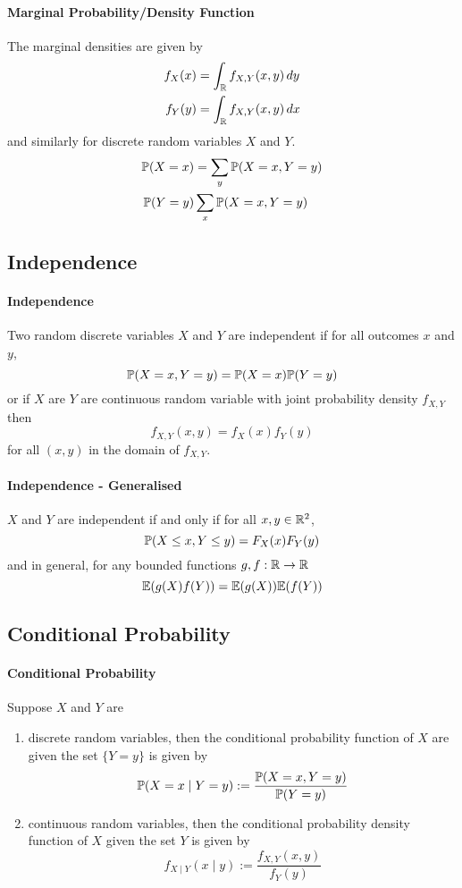 \paragraph{Marginal Probability/Density Function}
The marginal densities are given by
\begin{align*}
    f_X(x) & = \int_{\mathbb{R}} f_{X,Y}(x,y) \, dy \\
    f_Y(y) & = \int_{\mathbb{R}} f_{X,Y}(x,y) \, dx
\end{align*}
and similarly for discrete random variables \(X\) and \(Y\).
\begin{align*}
    \mathbb{P}(X = x) & = \sum_y \mathbb{P}(X = x, Y = y) \\
    \mathbb{P}(Y = y) & \sum_x \mathbb{P}(X = x, Y = y)
\end{align*}

\subsection{Independence}
\paragraph{Independence}
Two random discrete variables \(X\) and \(Y\) are independent if for all outcomes \(x\) and \(y\),
\[\mathbb{P}(X = x, Y = y) = \mathbb{P}(X = x)\mathbb{P}(Y = y)\]
or if \(X\) are \(Y\) are continuous random variable with joint probability density \(f_{X,Y}\) then
\[f_{X,Y} (x,y) = f_X(x) f_Y(y)\]
for all \((x,y)\) in the domain of \(f_{X,Y}\).

\paragraph{Independence - Generalised}
\(X\) and \(Y\) are independent if and only if for all \(x,y \in \mathbb{R}^2\),
\[\mathbb{P}(X \leq x, Y \leq y) = F_X(x)F_Y(y)\]
and in general, for any bounded functions \(g,f:\mathbb{R} \to \mathbb{R}\)
\[\mathbb{E}(g(X)f(Y)) = \mathbb{E}(g(X))\mathbb{E}(f(Y))\]

\subsection{Conditional Probability}
\paragraph{Conditional Probability}
Suppose \(X\) and \(Y\) are
\begin{enumerate}
    \item discrete random variables, then the conditional probability function of \(X\) are given the set \(\{Y = y\}\) is given by
    \[\mathbb{P}(X = x \mid Y = y) := \frac{\mathbb{P}(X = x, Y = y)}{\mathbb{P}(Y = y)}\]
    \item continuous random variables, then the conditional probability density function of \(X\) given the set \(Y\) is given by
    \[f_{X \mid Y}(x \mid y) := \frac{f_{X,Y}(x,y)}{f_Y(y)}\]
\end{enumerate}


